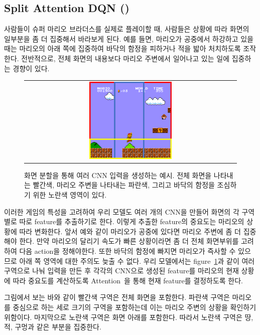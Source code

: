 \subsection{Split Attention DQN (\sadqnname)}
\label{sec:method:idea}
사람들이 슈퍼 마리오 브라더스를 실제로 플레이할 때, 사람들은 상황에 따라 화면의 일부분을 좀 더 집중해서 바라보게 된다.
예를 들면, 마리오가 공중에서 하강하고 있을 때는 마리오의 아래 쪽에 집중하여 바닥의 함정을 피하거나 적을 밟아 처치하도록 조작한다.
전반적으로, 전체 화면의 내용보다 마리오 주변에서 일어나고 있는 일에 집중하는 경향이 있다.

\begin{figure}[]
\begin{center}
\begin{tabular}{c}
     \includegraphics[width=0.4\textwidth]{FIG/split_screen.pdf} \\
\end{tabular}
\caption{
	화면 분할을 통해 여러 CNN 입력을 생성하는 예시. 전체 화면을 나타내는 빨간색, 마리오 주변을 나타내는 파란색, 그리고 바닥의 함정을 조심하기 위한 노란색 영역이 있다.
}
\label{fig:split_screen}
\end{center}
\end{figure}

이러한 게임의 특성을 고려하여 우리 모델도 여러 개의 CNN을 만들어 화면의 각 구역별로 따로 feature를 추출하기로 한다.
이렇게 추출한 feature의 중요도는 마리오의 상황에 따라 변화한다. 앞서 예와 같이 마리오가 공중에 있다면 마리오 주변에 좀 더 집중해야 한다.
만약 마리오의 달리기 속도가 빠른 상황이라면 좀 더 전체 화면부위를 고려하여 다음 action을 정해야한다.
또한 바닥의 함정에 빠지면 마리오가 즉사할 수 있으므로 아래 쪽 영역에 대한 주의도 늦출 수 없다.
우리 모델에서는 figure~\ref{fig:split_screen}과 같이 여러 구역으로 나눠 입력을 만든 후 각각의 CNN으로 생성된 feature를 마리오의 현재 상황에 따라 중요도를 계산하도록 Attention~\cite{Attention}을 통해 현재 feature를 결정하도록 한다.

그림에서 보는 바와 같이 빨간색 구역은 전체 화면을 포함한다. 
파란색 구역은 마리오를 중심으로 하는 세로 크기의 구역을 포함하는데 이는 마리오 주변의 상황을 확인하기 위함이다.
마지막으로 노란색 구역은 화면 아래를 포함한다. 
따라서 노란색 구역은 땅, 적, 구멍과 같은 부분을 집중한다. 

